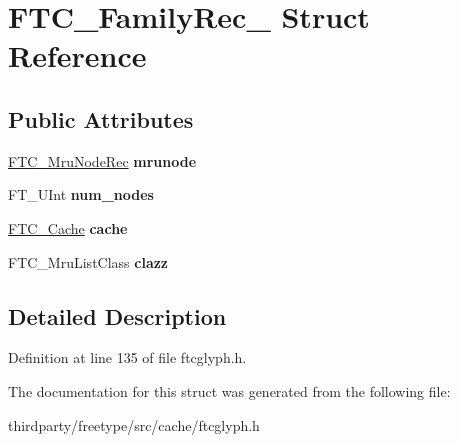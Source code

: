\hypertarget{struct_f_t_c___family_rec__}{}\section{F\+T\+C\+\_\+\+Family\+Rec\+\_\+ Struct Reference}
\label{struct_f_t_c___family_rec__}
\subsection*{Public Attributes}
\begin{DoxyCompactItemize}
\item 
\mbox{\label{struct_f_t_c___family_rec___a8e2b6efbc862107de51d6ee87f2cd09a}} 
\hyperlink{struct_f_t_c___mru_node_rec__}{F\+T\+C\+\_\+\+Mru\+Node\+Rec} {\bfseries mrunode}
\item 
\mbox{\label{struct_f_t_c___family_rec___a5878abfe3f75aca4550738264ddd5543}} 
F\+T\+\_\+\+U\+Int {\bfseries num\+\_\+nodes}
\item 
\mbox{\label{struct_f_t_c___family_rec___a4c004b25e43bb56007b037e8e6f1cc98}} 
\hyperlink{struct_f_t_c___cache_rec__}{F\+T\+C\+\_\+\+Cache} {\bfseries cache}
\item 
\mbox{\label{struct_f_t_c___family_rec___a27df67b5c3396c6ccb61b8db231333bf}} 
F\+T\+C\+\_\+\+Mru\+List\+Class {\bfseries clazz}
\end{DoxyCompactItemize}


\subsection{Detailed Description}


Definition at line 135 of file ftcglyph.\+h.



The documentation for this struct was generated from the following file\+:\begin{DoxyCompactItemize}
\item 
thirdparty/freetype/src/cache/ftcglyph.\+h\end{DoxyCompactItemize}

